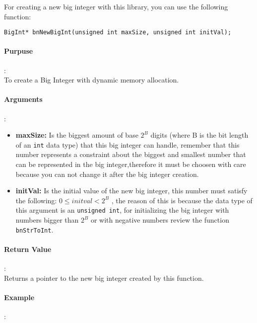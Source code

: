 \documentclass{book}
\begin{document}
For creating a new big integer with this library, you can use the following function:

\begin{verbatim}
BigInt* bnNewBigInt(unsigned int maxSize, unsigned int initVal);
\end{verbatim}

\paragraph{Purpuse}:\\

To create a Big Integer with dynamic memory allocation.

\paragraph{Arguments}:\\

\begin{itemize}
\item {\bf maxSize:} Is the biggest amount of base $2^B$ digits (where B is the bit length of an \verb+int+ data type)  that this big integer can handle, remember that this number represents a constraint about the biggest and smallest number that can be represented in the big integer,therefore it must be choosen with care because you can not change it after the big integer creation.\\
\item {\bf initVal:} Is the initial value of the new big integer, this number must satisfy the following: $0 \leq initval< 2^B$ , the reason of this is because the data type of this argument is an \verb+unsigned int+, for initializing the big integer with numbers bigger than $2^B$ or with negative numbers review the function \verb+bnStrToInt+.
\end{itemize}

\paragraph{Return Value}:\\

Returns a pointer to the new big integer created by this function.

\paragraph{Example}:\\
\end{document}
